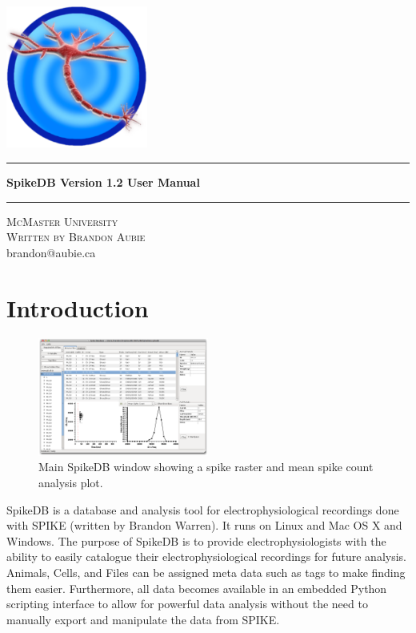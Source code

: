 \documentclass{report}
\begin{document}

\begin{titlepage}
	\begin{center}
		\includegraphics[width=0.35\textwidth]{icon.pdf}\\
		[4.0cm]
		\hrule\vspace{0.4cm}
		{ \huge \bfseries SpikeDB Version 1.2 User Manual }\\[0.4cm]
		\hrule 
		\vspace{4cm}
		\textsc{\LARGE McMaster University}\\
		[0.5cm]
		\textsc{\Large Written by Brandon Aubie}\\
		\vspace{0.5cm}
		{\large brandon@aubie.ca}

	\end{center}
\end{titlepage}

\tableofcontents 

\chapter{Introduction}
\begin{figure}[h]
\begin{center}
	\includegraphics[width=0.5\textwidth]{main_window.png}
\end{center}
\caption{Main SpikeDB window showing a spike raster and mean spike count analysis plot.}
\end{figure}
SpikeDB is a database and analysis tool for electrophysiological recordings done with SPIKE (written by Brandon Warren). It runs on Linux and Mac OS X and Windows. The purpose of SpikeDB is to provide electrophysiologists with the ability to easily catalogue their electrophysiological recordings for future analysis. Animals, Cells, and Files can be assigned meta data such as tags to make finding them easier. Furthermore, all data becomes available in an embedded Python scripting interface to allow for powerful data analysis without the need to manually export and manipulate the data from SPIKE.
\end{document}
